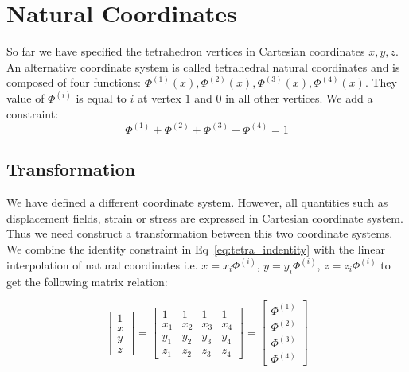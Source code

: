 \documentclass[en]{minipw} %
\begin{document}
\section{Natural Coordinates}

So far we have specified the tetrahedron vertices in Cartesian coordinates $x,y,z$. An alternative coordinate system is called tetrahedral natural coordinates and is composed of four functions: $\Phi^{(1)}(x), \Phi^{(2)}(x), \Phi^{(3)}(x), \Phi^{(4)}(x)$. They value of $\Phi^{(i)}$ is equal to $i$ at vertex $1$ and 0 in all other vertices. We add a constraint:
\begin{equation}
\label{eq:tetra_indentity}
\Phi^{(1)} + \Phi^{(2)} + \Phi^{(3)} + \Phi^{(4)} = 1
\end{equation}

\subsection{Transformation}

We have defined a different coordinate system. However, all quantities such as displacement fields, strain or stress are expressed in Cartesian coordinate system. Thus we need construct a transformation between this two coordinate systems. We combine the identity constraint in Eq~\ref{eq:tetra_indentity} with the linear interpolation of natural coordinates i.e. $x = x_i \Phi^{(i)}$, $y = y_i \Phi^{(i)}$, $z = z_i \Phi^{(i)}$ to get the following matrix relation:

\begin{equation}
\begin{bmatrix}
1 \\
x \\
y \\
z
\end{bmatrix}
=
\begin{bmatrix}
1 & 1 & 1 & 1 \\
x_1 & x_2 & x_3 & x_4 \\
y_1 & y_2 & y_3 & y_4 \\
z_1 & z_2 & z_3 & z_4
\end{bmatrix}
=
\begin{bmatrix}
\Phi^{(1)} \\
\Phi^{(2)} \\
\Phi^{(3)} \\
\Phi^{(4)}
\end{bmatrix}
\end{equation}
\end{document}
